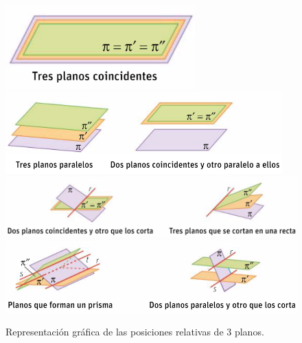 \newpage
\begin{figure}[hptb]
    \centering
    \includegraphics[width=0.65\textwidth]{img/Captura1.png}
    \includegraphics[width=0.95\textwidth]{img/Captura2.png}
    \includegraphics[width=1.1\textwidth]{img/Captura3.png}
    \includegraphics[width=1.1\textwidth]{img/Captura4.png}
    \caption{Representación gráfica de las posiciones relativas de 3 planos.}
    \label{fig:PosicionesRelativasPlanos}
\end{figure}


